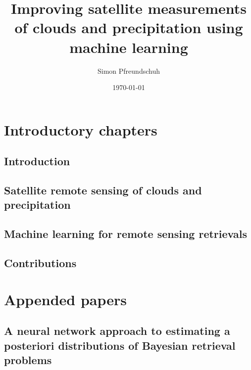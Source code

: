 \documentclass[12pt, a4paper, twoside, openright]{report}
\title{Improving satellite measurements of clouds and precipitation using \mbox{machine} learning}
\author{Simon Pfreundschuh}
\date{\today}
\begin{document}





\tableofcontents
\clearpage



\part{Introductory chapters}

\chapter{Introduction}


\chapter{Satellite remote sensing of clouds and precipitation}


\chapter{Machine learning for remote sensing retrievals}


\chapter{Contributions}


\raggedright

 

\part{Appended papers}

\renewcommand{\chaptername}{Paper}
\setcounter{chapter}{0}

\chapter{A neural network approach to estimating a posteriori distributions of Bayesian retrieval problems} 
\label{chap:qrnn}
\thispagestyle{empty}
\cleardoublepage            %

\end{document}
